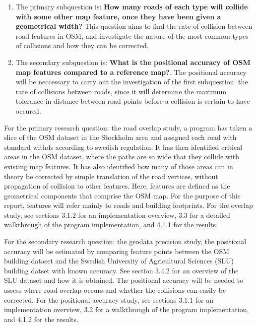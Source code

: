 \documentclass{kththesis}
\begin{document}
\begin{enumerate}
    \item The primary subquestion is: \textbf{How many roads of each type will collide with some other map feature, once they have been given a geometrical width?} This question aims to find the rate of collision between road features in OSM, and investigate the nature of the most common types of collisions and how they can be corrected.
    \item The secondary subquestion is: \textbf{What is the positional accuracy of OSM map features compared to a reference map?}. The positional accuracy will be neccessary to carry out the investigation of the first subquestion: the rate of collisions between roads, since it will determine the maximum tolerance in distance between road points before a collision is certain to have occured.
\end{enumerate}

For the primary research question: the road overlap study, a program has taken a slice of the OSM dataset in the Stockholm area and assigned each road with standard withds according to swedish regulation.
It has then identified critical areas in the OSM dataset, where the paths are so wide that they collide with existing map features.
It has also identified how many of those areas can in theory be corrected by simple translation of the road vertices, without propagation of collision to other features.
Here, features are defined as the geometrical components that comprise the OSM map.
For the purpose of this report, features will refer mainly to roads and building footprints.
For the overlap study, see sections 3.1.2 for an implementation overview, 3.3 for a detailed walkthrough of the program implementation, and 4.1.1 for the results.


For the secondary research question: the geodata precision study, the positional accuracy will be estimated by comparing feature points between the OSM building dataset and the Swedish University of Agricultural Sciences (SLU) building datset with known accuracy. See section 3.4.2 for an overview of the SLU dataset and how it is obtained.
The positional accuracy will be needed to assess where road overlap occurs and whether the collisions can easily be corrected.
For the positional accuracy study, see sections 3.1.1 for an implementation overview, 3.2 for a walkthrough of the program implementation, and 4.1.2 for the results.
\end{document}
